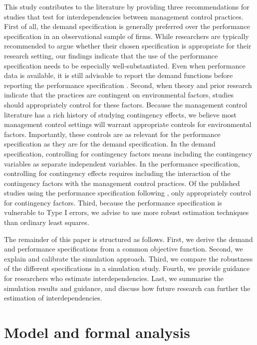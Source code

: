 \documentclass[12pt]{article}
\begin{document}
This study contributes to the literature by providing three recommendations for studies that test for interdependencies between management control practices. First of all, the demand specification is generally preferred over the performance specification in an observational sample of firms. While researchers are typically recommended to argue whether their chosen specification is appropriate for their research setting, our findings indicate that the use of the performance specification needs to be especially well-substantiated. Even when performance data is available, it is still advisable to report the demand functions before reporting the performance specification \citep{aral_three-way_2012, cassiman_search_2006}. Second, when theory and prior research indicate that the practices are contingent on environmental factors, studies should appropriately control for these factors. Because the management control literature has a rich history of studying contingency effects, we believe most management control settings will warrant appropriate controls for environmental factors. Importantly, these controls are as relevant for the performance specification as they are for the demand specification. In the demand specification, controlling for contingency factors means including the contingency variables as separate independent variables. In the performance specification, controlling for contingency effects requires including the interaction of the contingency factors with the management control practices. Of the published studies using the performance specification following \citet{grabner_management_2013}, only \citet{bedford_management_2016, bedford_performance_2019} appropriately control for contingency factors. Third, because the performance specification is vulnerable to Type I errors, we advise to use more robust estimation techniques than ordinary least squares.

The remainder of this paper is structured as follows. First, we derive the demand and performance specifications from a common objective function. Second, we explain and calibrate the simulation approach. Third, we compare the robustness of the different specifications in a simulation study. Fourth, we provide guidance for researchers who estimate interdependencies. Last, we summarise the simulation results and guidance, and discuss how future research can further the estimation of interdependencies.

\section{Model and formal analysis}\label{model-and-formal-analysis}
\end{document}

